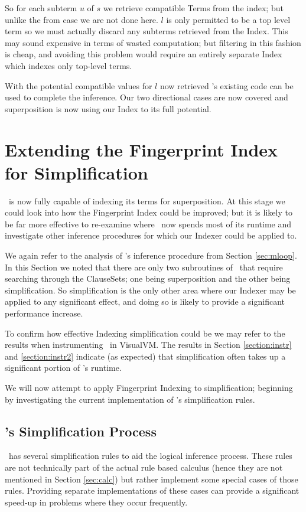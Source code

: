 So for each subterm $u$ of $s$ we retrieve compatible Terms from the index; but
unlike the from case we are not done here. $l$ is only permitted to be a top level term
so we must actually discard any subterms retrieved from the Index. This may sound expensive in terms
of wasted computation; but filtering in this fashion is cheap, and avoiding this
problem would require an entirely separate Index which indexes only top-level terms.
 
With the potential compatible values for $l$ now retrieved \beagle's existing code
can be used to complete the inference. Our two directional cases are now
covered and superposition is now using our Index to its full potential.

\section{Extending the Fingerprint Index for Simplification}
\label{sec:simp}

\Beagle\ is now fully capable of indexing its terms for superposition. At this stage
we could look into how the Fingerprint Index could be improved; but it is likely
to be far more effective to re-examine where \beagle\ now spends most of its runtime
and investigate other inference procedures for which our Indexer could be applied to. 

We again refer to the analysis of \beagle's inference procedure from Section \ref{sec:mloop}.
In this Section we noted that there are only two subroutines of \beagle\ that require
searching through the ClauseSets; one being superposition and the other being simplification.
So simplification is the only other area where our Indexer may be applied to
any significant effect, and doing so is likely to provide a significant performance
increase.

To confirm how effective Indexing simplification could be we may refer to the results when
instrumenting \beagle\ in VisualVM. The results in Section \ref{section:instr} and \ref{section:instr2}
indicate (as expected) that simplification often takes up a significant portion
of \beagle's runtime.

We will now attempt to apply Fingerprint Indexing to simplification; beginning
by investigating the current implementation of \beagle's simplification rules. 

\subsection{\Beagle's Simplification Process}
\label{sec:simprules}
\Beagle\ has several simplification rules to aid the logical inference process.
These rules are not technically part of the actual rule based calculus
(hence they are not mentioned in Section \ref{sec:calc}) but rather
implement some special cases of those rules. Providing separate implementations
of these cases can provide a significant speed-up in problems where they occur
frequently.

